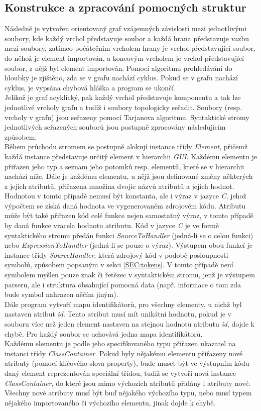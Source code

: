 \documentclass[11pt,twoside,a4paper]{book}
\begin{document}
\subsection{Konstrukce a zpracování pomocných struktur}
Následně je vytvořen orientovaný graf vzájemných závislostí mezi jednotlivými soubory, kde každý vrchol představuje soubor a každá hrana představuje vazbu mezi soubory, zatímco počátečním vrcholem hrany je vrchol představující soubor, do něhož je element importován, a koncovým vrcholem je vrchol představující soubor, z nějž byl element importován. Pomocí algoritmu prohledávání do hloubky je zjištěno, zda se v grafu nachází cyklus. Pokud se v grafu nachází cyklus, je vypsána chybová hláška a program se ukončí.\\
Jelikož je graf acyklický, pak každý vrchol představuje komponentu a tak lze jednotlivé vrcholy grafu a tudíž i soubory topologicky seřadit. Soubory (resp. vrcholy v grafu) jsou seřazeny pomocí Tarjanova algoritmu. Syntaktické stromy jednotlivých seřazených souborů jsou postupně zpracovány následujícím způsobem.\\
Během průchodu stromem se postupně alokují instance třídy \textit{Element}, přičemž každá instance představuje určitý element v hierarchii \textit{GUI}. Každému elementu je přiřazen jeho typ a seznam jeho potomků resp. elementů, které se v hierarchii nachází níže. Dále je každému elementu, u nějž jsou definované změny některých z jejich atributů, přiřazena množina dvojic názvů atributů a jejich hodnot. Hodnotou v tomto případě nemusí být konstanta, ale i výraz v jazyce \textit{C}, jehož výpočtem se získá daná hodnota ve vygenerovaném zdrojovém kódu. Atributu může být také přiřazen kód celé funkce nejen samostatný výraz, v tomto případě by daná funkce vracela hodnotu atributu. Kód v jazyce \textit{C} je ve formě syntaktického stromu předán funkci \textit{SourceToHandler} (jedná-li se o celou funkci) nebo \textit{ExpressionToHandler} (jedná-li se pouze o výraz). Výstupem obou funkcí je instance třídy \textit{SourceHandler}, která zdrojový kód v podobě posloupnosti symbolů, způsobem popsaným v sekci \ref{SEC:tokens}. V tomto případě není symbolem myšlen pouze znak či řetězec v syntaktickém stromu, jenž je výstupem parseru, ale i struktura obsahující pomocná data (např. informace o tom zda bude symbol nahrazen něčím jiným).\\
Dále program vytvoří mapu identifikátorů, pro všechny elementy, u nichž byl nastaven atribut \textit{id}. Tento atribut musí mít unikátní hodnotu, pokud je v souboru více než jeden element nastaven na stejnou hodnotu atributu \textit{id}, dojde k chybě. Pro každý soubor se uchovává jedna mapa identifikátorů.\\
Každému elementu je podle jeho specifikovaného typu přiřazen ukazatel na instanci třídy \textit{ClassContainer}. Pokud byly nějakému elementu přiřazeny nové atributy (pomocí klíčového slova property), bude muset být ve výstupním kódu daný element reprezentován speciální třídou, tudíž se vytvoří nová instance \textit{ClassContainer}, do které jsou mimo výchozích atributů přidány i atributy nové. Všechny nové atributy musí být buď nějakého výchozího typu, nebo musí typem nějakého importovaného či výchozího elementu, jinak dojde k chybě.
\end{document}
